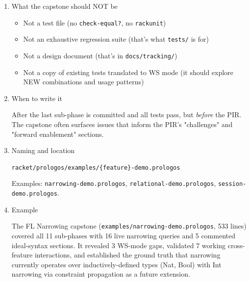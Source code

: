 \documentclass[11pt]{article}
\begin{document}
\begin{enumerate}
\begin{itemize}
\item \textbf{Prologos header and \texttt{ns} declaration}: First-class \texttt{.prologos} file
in the examples directory
\item \textbf{Sections organized by feature/phase}: Each section introduces one
capability with commentary explaining the mechanism
\item \textbf{Live executable expressions}: Every uncommented expression must run
without errors
\item \textbf{Commented ideal syntax}: Features not yet surfaced in WS mode are
shown as commented-out ideal syntax with \texttt{NOTE:} explaining the gap
\item \textbf{Cross-feature exercises}: At least one section showing how the new
feature composes with existing features (e.g., narrowing + functional
code, narrowing + prelude functions, narrowing + user definitions)
\item \textbf{Summary table}: Lines/tests per sub-phase, giving readers a sense
of the implementation's scope
\end{itemize}
\item What the capstone should NOT be
\label{sec:org2e79e47}

\begin{itemize}
\item Not a test file (no \texttt{check-equal?}, no \texttt{rackunit})
\item Not an exhaustive regression suite (that's what \texttt{tests/} is for)
\item Not a design document (that's in \texttt{docs/tracking/})
\item Not a copy of existing tests translated to WS mode (it should explore
NEW combinations and usage patterns)
\end{itemize}
\item When to write it
\label{sec:org0f316d9}

After the last sub-phase is committed and all tests pass, but \emph{before}
the PIR. The capstone often surfaces issues that inform the PIR's
"challenges" and "forward enablement" sections.
\item Naming and location
\label{sec:org81f05de}

\texttt{racket/prologos/examples/\{feature\}-demo.prologos}

Examples: \texttt{narrowing-demo.prologos}, \texttt{relational-demo.prologos},
\texttt{session-demo.prologos}.
\item Example
\label{sec:org78a4ea7}

The FL Narrowing capstone (\texttt{examples/narrowing-demo.prologos}, 533 lines)
covered all 11 sub-phases with 16 live narrowing queries and 5 commented
ideal-syntax sections. It revealed 3 WS-mode gaps, validated 7 working
cross-feature interactions, and established the ground truth that
narrowing currently operates over inductively-defined types (Nat, Bool)
with Int narrowing via constraint propagation as a future extension.
\end{enumerate}
\end{document}
